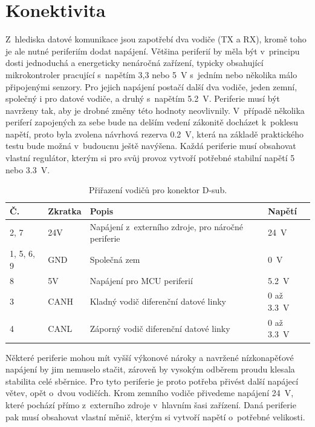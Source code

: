     \section{Konektivita}
    \label{subsec:pocet-a-fce-vodicu-sbernice}
    Z~hlediska datové komunikace jsou zapotřebí dva vodiče (TX a RX), kromě toho je ale nutné periferiím dodat napájení. Většina periferií by měla být v~principu dosti jednoduchá a energeticky nenáročná zařízení, typicky obsahující mikrokontroler pracující s~napětím 3,3 nebo \qty{5}{V} s~jedním nebo několika málo připojenými senzory. Pro jejich napájení postačí další dva vodiče, jeden zemní, společný i pro datové vodiče, a druhý s~napětím \qty{5.2}{V}. Periferie musí být navrženy tak, aby je drobné změny této hodnoty neovlivnily. V~případě několika periferí zapojených za sebe bude na delším vedení zákonitě docházet k~poklesu napětí, proto byla zvolena návrhová rezerva \qty{0.2}{V}, která na základě praktického testu bude možná v~budoucnu ještě navýšena. Každá periferie musí obsahovat vlastní regulátor, kterým si pro svůj provoz vytvoří potřebné stabilní napětí 5 nebo \qty{3,3}{V}. 
    \begin{table}[h!]
        \centering
        \caption{Přiřazení vodičů pro konektor D-sub.}
        \label{tab:sbernice-popis-vodicu}
        \begin{tabular}{|l|l|l|l|}
            \hline
            \textbf{Č.} & \textbf{Zkratka} & \textbf{Popis} & \textbf{Napětí} \\
            \hline\hline
            2, 7 & 24V & Napájení z~externího zdroje, pro náročné periferie & \qty{24}{V} \\
            \hline
            1, 5, 6, 9 & GND & Společná zem & \qty{0}{V}\\
            \hline
            8 & 5V & Napájení pro MCU periferií & \qty{5.2}{V}\\
            \hline
            3 & CANH & Kladný vodič diferenční datové linky & 0 až \qty{3.3}{V}\\
            \hline
            4 & CANL & Záporný vodič diferenční datové linky & 0 až \qty{3.3}{V}\\
            \hline
        \end{tabular}
    \end{table}

    Některé periferie mohou mít vyšší výkonové nároky a navržené nízkonapěťové napájení by jim nemuselo stačit, zároveň by vysokým odběrem proudu klesala stabilita celé sběrnice. Pro tyto periferie je proto potřeba přivést další napájecí větev, opět o~dvou vodičích. Krom zemního vodiče přivedeme napájení \qty{24}{V}, které pochází přímo z~externího zdroje v~hlavním šasi zařízení. Daná periferie pak musí obsahovat vlastní měnič, kterým si vytvoří napětí o~potřebné velikosti. 

